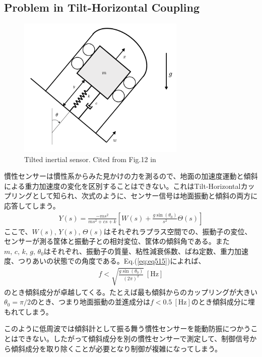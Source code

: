 \subsection{Problem in Tilt-Horizontal Coupling}
\begin{figure}[h]
  \begin{center}   
    \includegraphics[width=8cm]{./img_chap5/img509.png}
    \caption{Tilted inertial sensor. Cited from Fig.12 in \cite{collette2012inertial}} \label{img:img509}
  \end{center}
\end{figure}

慣性センサーは慣性系からみた見かけの力を測るので、地面の加速度運動と傾斜による重力加速度の変化を区別することはできない。これはTilt-Horizontalカップリングとして知られ、次式のように、センサー信号は地面振動と傾斜の両方に応答してしまう\cite{collette2012inertial}。
\begin{eqnarray}
  Y(s)=\frac{-m s^{2}}{m s^{2}+c s+k} \left[ W(s) + \frac{g \sin \left(\theta_{0}\right)}{s^2} \Theta(s) \right] \label{eq:eq515}
\end{eqnarray}
ここで、$W(s),\,Y(s),\,\Theta(s)$はそれぞれラプラス空間での、振動子の変位、センサーが測る筐体と振動子との相対変位、筐体の傾斜角である。また$m,\,c,\,k,\,g,\,\theta_0$はそれぞれ、振動子の質量、粘性減衰係数、ばね定数、重力加速度、つりあいの状態での角度である。Eq.(\ref{eq:eq515})によれば、
\begin{eqnarray}
  f < \sqrt{\frac{g\sin(\theta_0)}{(2\pi)^2}}\ [\mathrm{Hz}]
  \label{eq:eq515}
\end{eqnarray}
のとき傾斜成分が卓越してくる。たとえば最も傾斜からのカップリングが大きい$\theta_0=\pi/2$のとき、つまり地面振動の並進成分は$f<0.5\ [\mathrm{Hz}]$のとき傾斜成分に埋もれてしまう。

このように低周波では傾斜計として振る舞う慣性センサーを能動防振につかうことはできない。したがって傾斜成分を別の慣性センサーで測定して、制御信号から傾斜成分を取り除くことが必要となり制御が複雑になってしまう\cite{biscans2018optimization}。





